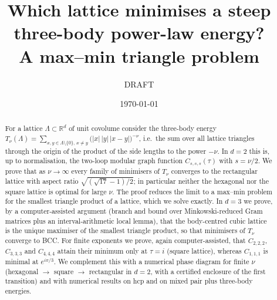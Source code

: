 \documentclass[11pt,a4paper]{amsart}
\title[Three-body lattice energies in the limit of steep decay]{Which lattice minimises a steep three-body power-law energy?\\ A max--min triangle problem}
\author{DRAFT}
\date{\today}
\theoremstyle{definition}
\newcommand{\R}{\mathbb{R}}
\newcommand{\Lat}{\Lambda}
\begin{document}
\begin{abstract}
For a lattice $\Lat\subset\R^d$ of unit covolume consider the three-body energy
$T_\nu(\Lat)=\sum_{x,y\in\Lat\setminus\{0\},\,x\neq y}\bigl(|x|\,|y|\,|x-y|\bigr)^{-\nu}$, i.e.\ the sum over all lattice triangles through the origin of the product of the side lengths to the power $-\nu$.
In $d=2$ this is, up to normalisation, the two-loop modular graph function $C_{s,s,s}(\tau)$ with $s=\nu/2$.
We prove that as $\nu\to\infty$ every family of minimisers of $T_\nu$ converges to the rectangular lattice with aspect ratio $\sqrt{(\sqrt{17}-1)/2}$; in particular neither the hexagonal nor the square lattice is optimal for large $\nu$.
The proof reduces the limit to a max--min problem for the smallest triangle product of a lattice, which we solve exactly.
In $d=3$ we prove, by a computer-assisted argument (branch and bound over Minkowski-reduced Gram matrices plus an interval-arithmetic local lemma), that the body-centred cubic lattice is the unique maximiser of the smallest triangle product, so that minimisers of $T_\nu$ converge to BCC.
For finite exponents we prove, again computer-assisted, that $C_{2,2,2}$, $C_{3,3,3}$ and $C_{4,4,4}$ attain their minimum only at $\tau=i$ (square lattice), whereas $C_{1,1,1}$ is minimal at $e^{i\pi/3}$. We complement this with a numerical phase diagram for finite $\nu$ (hexagonal $\to$ square $\to$ rectangular in $d=2$, with a certified enclosure of the first transition) and with numerical results on hcp and on mixed pair plus three-body energies.
\end{abstract}
\maketitle
\end{document}
